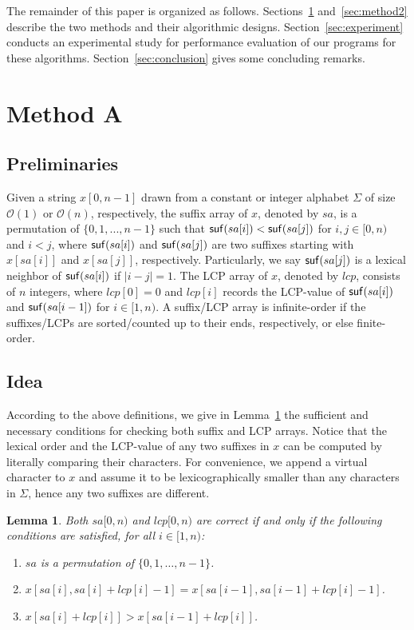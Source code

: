 \documentclass[10pt,journal,compsoc]{IEEEtran}
\newtheorem{Lemma}{Lemma}
\begin{document}
The remainder of this paper is organized as follows. Sections~\ref{sec:method1} and~\ref{sec:method2} describe the two methods and their algorithmic designs. Section~\ref{sec:experiment} conducts an experimental study for performance evaluation of our programs for these algorithms. Section~\ref{sec:conclusion} gives some concluding remarks. 

\section{Method A} \label{sec:method1}


\subsection{Preliminaries} \label{sec:method1:notations}

Given a string $x[0, n-1]$ drawn from a constant or integer alphabet $\Sigma$ of size $\mathcal{O}(1)$ or $\mathcal{O}(n)$, respectively, the suffix array of $x$, denoted by $sa$, is a permutation of $\{0, 1, ..., n - 1\}$ such that ${\sf suf}(sa[i]) < {\sf suf}(sa[j])$ for $i, j \in [0, n)$ and $i < j$, where ${\sf suf}(sa[i])$ and ${\sf suf}(sa[j])$ are two suffixes starting with $x[sa[i]]$ and $x[sa[j]]$, respectively. Particularly, we say ${\sf suf}(sa[j])$ is a lexical neighbor of ${\sf suf}(sa[i])$ if $|i - j| = 1$. The LCP array of $x$, denoted by $lcp$, consists of $n$ integers, where $lcp[0]=0$ and $lcp[i]$ records the LCP-value of ${\sf suf}(sa[i])$ and ${\sf suf}(sa[i - 1])$ for $i \in [1, n)$. A suffix/LCP array is infinite-order if the suffixes/LCPs are sorted/counted up to their ends, respectively, or else finite-order.

\subsection{Idea} \label{sec:method1:idea}

According to the above definitions, we give in Lemma~\ref{lemma:1} the sufficient and necessary conditions for checking both suffix and LCP arrays. Notice that the lexical order and the LCP-value of any two suffixes in $x$ can be computed by literally comparing their characters. For convenience, we append a virtual character to $x$ and assume it to be lexicographically smaller than any characters in $\Sigma$, hence any two suffixes are different.


\begin{Lemma} \label{lemma:1}
	Both $sa[0, n)$ and $lcp[0, n)$ are correct if and only if the following conditions are satisfied, for all $i \in [1, n)$:
	\begin{enumerate}[(1)]
		\item
		$sa$ is a permutation of $\{0, 1, \dots, n - 1\}$.
		\item
		$x[sa[i], sa[i] + lcp[i] - 1] = x[sa[i - 1], sa[i - 1] + lcp[i] - 1]$.
		\item
		$x[sa[i] + lcp[i]] > x[sa[i - 1] + lcp[i]]$. 	
	\end{enumerate}
\end{Lemma}
\end{document}
